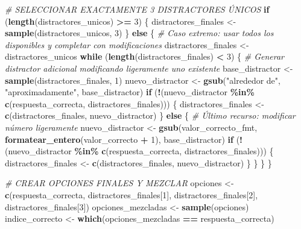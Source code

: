 \documentclass[
]{article}
\newenvironment{Shaded}{\begin{snugshade}}{\end{snugshade}}
\newcommand{\CommentTok}[1]{\textcolor[rgb]{0.56,0.35,0.01}{\textit{#1}}}
\newcommand{\ControlFlowTok}[1]{\textcolor[rgb]{0.13,0.29,0.53}{\textbf{#1}}}
\newcommand{\DecValTok}[1]{\textcolor[rgb]{0.00,0.00,0.81}{#1}}
\newcommand{\FunctionTok}[1]{\textcolor[rgb]{0.13,0.29,0.53}{\textbf{#1}}}
\newcommand{\NormalTok}[1]{#1}
\newcommand{\OtherTok}[1]{\textcolor[rgb]{0.56,0.35,0.01}{#1}}
\newcommand{\SpecialCharTok}[1]{\textcolor[rgb]{0.81,0.36,0.00}{\textbf{#1}}}
\newcommand{\StringTok}[1]{\textcolor[rgb]{0.31,0.60,0.02}{#1}}
\begin{document}
\begin{Shaded}
\begin{Highlighting}[]
\CommentTok{\# SELECCIONAR EXACTAMENTE 3 DISTRACTORES ÚNICOS}
\ControlFlowTok{if}\NormalTok{ (}\FunctionTok{length}\NormalTok{(distractores\_unicos) }\SpecialCharTok{\textgreater{}=} \DecValTok{3}\NormalTok{) \{}
\NormalTok{  distractores\_finales }\OtherTok{\textless{}{-}} \FunctionTok{sample}\NormalTok{(distractores\_unicos, }\DecValTok{3}\NormalTok{)}
\NormalTok{\} }\ControlFlowTok{else}\NormalTok{ \{}
  \CommentTok{\# Caso extremo: usar todos los disponibles y completar con modificaciones}
\NormalTok{  distractores\_finales }\OtherTok{\textless{}{-}}\NormalTok{ distractores\_unicos}
  \ControlFlowTok{while}\NormalTok{ (}\FunctionTok{length}\NormalTok{(distractores\_finales) }\SpecialCharTok{\textless{}} \DecValTok{3}\NormalTok{) \{}
    \CommentTok{\# Generar distractor adicional modificando ligeramente uno existente}
\NormalTok{    base\_distractor }\OtherTok{\textless{}{-}} \FunctionTok{sample}\NormalTok{(distractores\_finales, }\DecValTok{1}\NormalTok{)}
\NormalTok{    nuevo\_distractor }\OtherTok{\textless{}{-}} \FunctionTok{gsub}\NormalTok{(}\StringTok{"alrededor de"}\NormalTok{, }\StringTok{"aproximadamente"}\NormalTok{, base\_distractor)}
    \ControlFlowTok{if}\NormalTok{ (}\SpecialCharTok{!}\NormalTok{(nuevo\_distractor }\SpecialCharTok{\%in\%} \FunctionTok{c}\NormalTok{(respuesta\_correcta, distractores\_finales))) \{}
\NormalTok{      distractores\_finales }\OtherTok{\textless{}{-}} \FunctionTok{c}\NormalTok{(distractores\_finales, nuevo\_distractor)}
\NormalTok{    \} }\ControlFlowTok{else}\NormalTok{ \{}
      \CommentTok{\# Último recurso: modificar número ligeramente}
\NormalTok{      nuevo\_distractor }\OtherTok{\textless{}{-}} \FunctionTok{gsub}\NormalTok{(valor\_correcto\_fmt, }\FunctionTok{formatear\_entero}\NormalTok{(valor\_correcto }\SpecialCharTok{+} \DecValTok{1}\NormalTok{), base\_distractor)}
      \ControlFlowTok{if}\NormalTok{ (}\SpecialCharTok{!}\NormalTok{(nuevo\_distractor }\SpecialCharTok{\%in\%} \FunctionTok{c}\NormalTok{(respuesta\_correcta, distractores\_finales))) \{}
\NormalTok{        distractores\_finales }\OtherTok{\textless{}{-}} \FunctionTok{c}\NormalTok{(distractores\_finales, nuevo\_distractor)}
\NormalTok{      \}}
\NormalTok{    \}}
\NormalTok{  \}}
\NormalTok{\}}

\CommentTok{\# CREAR OPCIONES FINALES Y MEZCLAR}
\NormalTok{opciones }\OtherTok{\textless{}{-}} \FunctionTok{c}\NormalTok{(respuesta\_correcta, distractores\_finales[}\DecValTok{1}\NormalTok{], distractores\_finales[}\DecValTok{2}\NormalTok{], distractores\_finales[}\DecValTok{3}\NormalTok{])}
\NormalTok{opciones\_mezcladas }\OtherTok{\textless{}{-}} \FunctionTok{sample}\NormalTok{(opciones)}
\NormalTok{indice\_correcto }\OtherTok{\textless{}{-}} \FunctionTok{which}\NormalTok{(opciones\_mezcladas }\SpecialCharTok{==}\NormalTok{ respuesta\_correcta)}


\end{Highlighting}
\end{Shaded}
\end{document}
